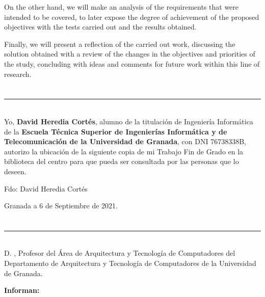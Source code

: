 On the other hand, we will make an analysis of the requirements that were intended to be covered, to later expose the degree of achievement of the proposed objectives with the tests carried out and the results obtained.

Finally, we will present a reflection of the carried out work, discussing the solution obtained with a review of the changes in the objectives and priorities of the study, concluding with ideas and comments for future work within this line of research.

\chapter*{}
\thispagestyle{empty}

\noindent\rule[-1ex]{\textwidth}{2pt}\\[4.5ex]

Yo, \textbf{David Heredia Cortés}, alumno de la titulación de Ingeniería Informática de la \textbf{Escuela Técnica Superior
de Ingenierías Informática y de Telecomunicación de la Universidad de Granada}, con DNI 76738338B, autorizo la
ubicación de la siguiente copia de mi Trabajo Fin de Grado en la biblioteca del centro para que pueda ser
consultada por las personas que lo deseen.

\vspace{6cm}

\noindent Fdo: David Heredia Cortés

\vspace{2cm}

\begin{flushright}
Granada a 6 de Septiembre de 2021.
\end{flushright}


\chapter*{}
\thispagestyle{empty}

\noindent\rule[-1ex]{\textwidth}{2pt}\\[4.5ex]

D. \textbf{\myProf}, Profesor del Área de Arquitectura y Tecnología de Computadores del Departamento de Arquitectura y Tecnología de Computadores de la Universidad de Granada.


\vspace{0.5cm}

\textbf{Informan:}

\vspace{0.5cm}

